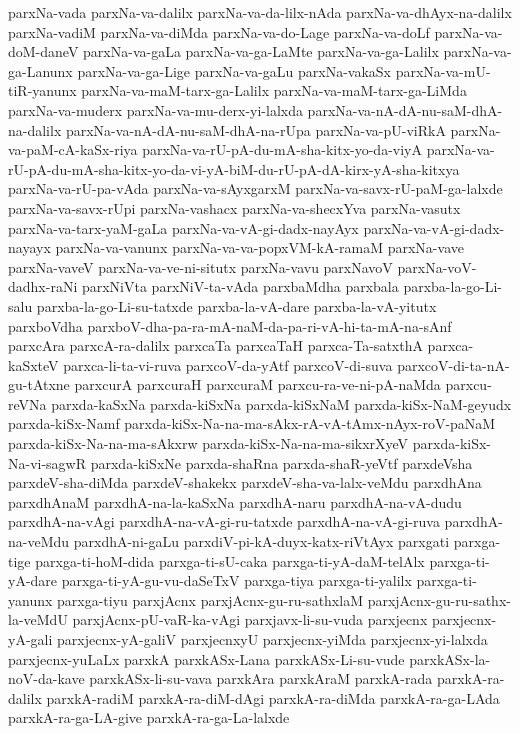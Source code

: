 {parxNa-vada
parxNa-va-dalilx
parxNa-va-da-lilx-nAda
parxNa-va-dhAyx-na-dalilx
parxNa-vadiM
parxNa-va-diMda
parxNa-va-do-Lage
parxNa-va-doLf
parxNa-va-doM-daneV
parxNa-va-gaLa
parxNa-va-ga-LaMte
parxNa-va-ga-Lalilx
parxNa-va-ga-Lanunx
parxNa-va-ga-Lige
parxNa-va-gaLu
parxNa-vakaSx
parxNa-va-mU-tiR-yanunx
parxNa-va-maM-tarx-ga-Lalilx
parxNa-va-maM-tarx-ga-LiMda
parxNa-va-muderx
parxNa-va-mu-derx-yi-lalxda
parxNa-va-nA-dA-nu-saM-dhA-na-dalilx
parxNa-va-nA-dA-nu-saM-dhA-na-rUpa
parxNa-va-pU-viRkA
parxNa-va-paM-cA-kaSx-riya
parxNa-va-rU-pA-du-mA-sha-kitx-yo-da-viyA
parxNa-va-rU-pA-du-mA-sha-kitx-yo-da-vi-yA-biM-du-rU-pA-dA-kirx-yA-sha-kitxya
parxNa-va-rU-pa-vAda
parxNa-va-sAyxgarxM
parxNa-va-savx-rU-paM-ga-lalxde
parxNa-va-savx-rUpi
parxNa-vashacx
parxNa-va-shecxYva
parxNa-vasutx
parxNa-va-tarx-yaM-gaLa
parxNa-va-vA-gi-dadx-nayAyx
parxNa-va-vA-gi-dadx-nayayx
parxNa-va-vanunx
parxNa-va-va-popxVM-kA-ramaM
parxNa-vave
parxNa-vaveV
parxNa-va-ve-ni-situtx
parxNa-vavu
parxNavoV
parxNa-voV-dadhx-raNi
parxNiVta
parxNiV-ta-vAda
parxbaMdha
parxbala
parxba-la-go-Li-salu
parxba-la-go-Li-su-tatxde
parxba-la-vA-dare
parxba-la-vA-yitutx
parxboVdha
parxboV-dha-pa-ra-mA-naM-da-pa-ri-vA-hi-ta-mA-na-sAnf
parxcAra
parxcA-ra-dalilx
parxcaTa
parxcaTaH
parxca-Ta-satxthA
parxca-kaSxteV
parxca-li-ta-vi-ruva
parxcoV-da-yAtf
parxcoV-di-suva
parxcoV-di-ta-nA-gu-tAtxne
parxcurA
parxcuraH
parxcuraM
parxcu-ra-ve-ni-pA-naMda
parxcu-reVNa
parxda-kaSxNa
parxda-kiSxNa
parxda-kiSxNaM
parxda-kiSx-NaM-geyudx
parxda-kiSx-Namf
parxda-kiSx-Na-na-ma-sAkx-rA-vA-tAmx-nAyx-roV-paNaM
parxda-kiSx-Na-na-ma-sAkxrw
parxda-kiSx-Na-na-ma-sikxrXyeV
parxda-kiSx-Na-vi-sagwR
parxda-kiSxNe
parxda-shaRna
parxda-shaR-yeVtf
parxdeVsha
parxdeV-sha-diMda
parxdeV-shakekx
parxdeV-sha-va-lalx-veMdu
parxdhAna
parxdhAnaM
parxdhA-na-la-kaSxNa
parxdhA-naru
parxdhA-na-vA-dudu
parxdhA-na-vAgi
parxdhA-na-vA-gi-ru-tatxde
parxdhA-na-vA-gi-ruva
parxdhA-na-veMdu
parxdhA-ni-gaLu
parxdiV-pi-kA-duyx-katx-riVtAyx
parxgati
parxga-tige
parxga-ti-hoM-dida
parxga-ti-sU-caka
parxga-ti-yA-daM-telAlx
parxga-ti-yA-dare
parxga-ti-yA-gu-vu-daSeTxV
parxga-tiya
parxga-ti-yalilx
parxga-ti-yanunx
parxga-tiyu
parxjAcnx
parxjAcnx-gu-ru-sathxlaM
parxjAcnx-gu-ru-sathx-la-veMdU
parxjAcnx-pU-vaR-ka-vAgi
parxjavx-li-su-vuda
parxjecnx
parxjecnx-yA-gali
parxjecnx-yA-galiV
parxjecnxyU
parxjecnx-yiMda
parxjecnx-yi-lalxda
parxjecnx-yuLaLx
parxkA
parxkASx-Lana
parxkASx-Li-su-vude
parxkASx-la-noV-da-kave
parxkASx-li-su-vava
parxkAra
parxkAraM
parxkA-rada
parxkA-ra-dalilx
parxkA-radiM
parxkA-ra-diM-dAgi
parxkA-ra-diMda
parxkA-ra-ga-LAda
parxkA-ra-ga-LA-give
parxkA-ra-ga-La-lalxde
}
